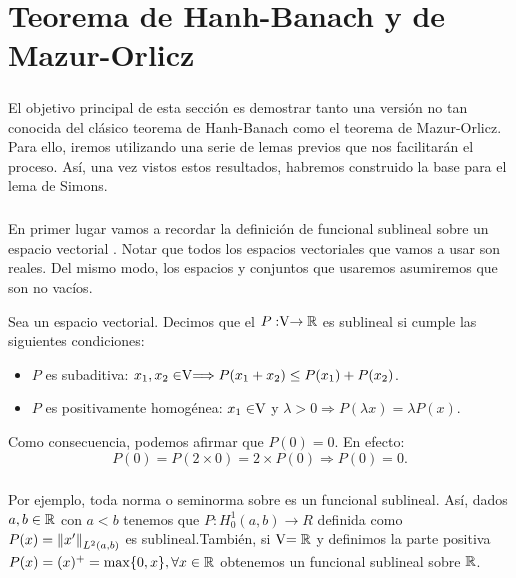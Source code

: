\chapter{Teorema de Hanh-Banach y de Mazur-Orlicz}
	\thispagestyle{empty}
	\paragraph{}El objetivo principal de esta sección es demostrar tanto una versión no tan conocida del clásico teorema de Hanh-Banach como el teorema de Mazur-Orlicz. Para ello, iremos utilizando una serie de lemas previos que nos facilitarán el proceso. Así, una vez vistos estos resultados, habremos construido la base para el lema de Simons.
	
	\paragraph{} En primer lugar vamos a recordar la definición de funcional sublineal sobre un espacio vectorial \vecSpace . Notar que todos los espacios vectoriales que vamos a usar son reales. Del mismo modo, los espacios y conjuntos que usaremos asumiremos que son no vacíos.
	
	\begin{definicion}
		Sea \vecSpace un espacio vectorial. Decimos que el $P:\vecSpace \rightarrow \RR$ es sublineal si cumple las siguientes condiciones:
		\begin{itemize}
			\item $ P $ es subaditiva: $x_1, x_2 \in \vecSpace \Longrightarrow P(x_1 + x_2) \leq P(x_1) + P(x_2) $.
			\item $ P $ es positivamente homogénea: $x_1 \in \vecSpace $ y $ \lambda > 0 \Longrightarrow P(\lambda x) = \lambda P(x) $.
		\end{itemize}
	\end{definicion}

	Como consecuencia, podemos afirmar que $ P(0) = 0 $. En efecto:
	\[
	P(0) = P(2\times0) = 2\times P(0) \Longrightarrow P(0) = 0.
	\]
	\paragraph{}Por ejemplo, toda norma o seminorma sobre \vecSpace es un funcional sublineal. Así, dados $ a,b \in \mathbb{R} $ con $ a <b $ tenemos que $ P:H^{1}_{0} (a,b) \longrightarrow R$ definida como $ P(x) = \left\Vert x'\right\Vert_{L^2(a,b)} $ es sublineal.También, si $ \vecSpace = \RR $ y definimos la parte positiva $ P(x) = (x)^{+} = \max \{0,x\}, \forall x \in \mathbb{R} $ obtenemos un funcional sublineal sobre $\mathbb{R}$.
	
